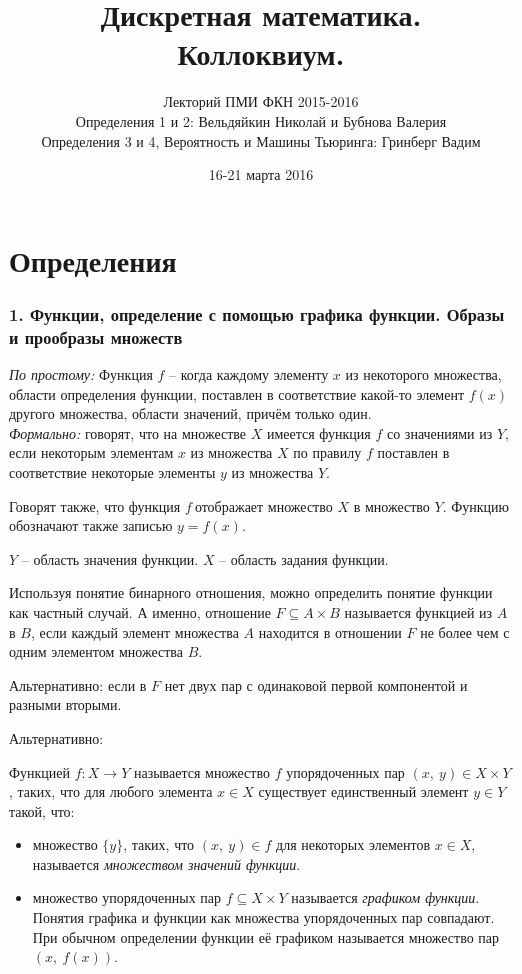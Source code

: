 \documentclass[a4paper, 12pt]{article}
\begin{document}
\title{Дискретная математика.\\ Коллоквиум.}
\author{Лекторий ПМИ ФКН 2015-2016\\ Определения 1 и 2: Вельдяйкин Николай и Бубнова Валерия \\ Определения 3 и 4, Вероятность и Машины Тьюринга: Гринберг Вадим}
\date{16-21 марта 2016}

\maketitle

\part*{Определения}

\section*{1. Функции, определение с помощью графика функции. Образы и прообразы множеств}
\textit{По простому:} Функция  $f$ -- когда каждому элементу $x$ из некоторого множества, области определения функции, поставлен в соответствие какой-то элемент $f(x)$ другого множества, области значений, причём только один. 
\\
\textit{Формально:} говорят, что на множестве $X$ имеется функция $f$ со значениями из $Y$, если некоторым элементам $x$ из множества $X$ по правилу $f$ поставлен в соответствие некоторые элементы $y$ из множества $Y$.

\par Говорят также, что функция $f\ \textit{отображает}$ множество $X$ в множество $Y$. Функцию обозначают также записью $y = f(x)$.

$Y$ -- область значения функции. $X$ -- область задания функции.

\par Используя понятие бинарного отношения, можно определить понятие функции как частный случай. А именно, отношение $F \subseteq A \times B$ называется функцией из $A$ в $B$, если каждый элемент множества $A$ находится в отношении $F$ не более чем с одним элементом множества $B$.
\par Альтернативно: если в $F$ нет двух пар с одинаковой первой компонентой и разными вторыми. 
\par Альтернативно:
\par Функцией $f:X \to Y$  называется множество $f$ упорядоченных пар $(x,\ y) \in X \times Y$, таких, что для любого элемента $x \in X$ существует единственный элемент $y \in Y$ такой, что:
\begin{itemize}
\item множество $\{y\}$, таких, что $(x,\ y) \in f$ для некоторых элементов $x \in X$, называется \textit{множеством значений функции}.
\item множество упорядоченных пар $f \subseteq X \times Y$ называется \textit{графиком функции}. Понятия графика и функции как множества упорядоченных пар совпадают. При обычном определении функции её графиком называется множество пар $(x,\ f(x))$.
\end{itemize}
\end{document}

